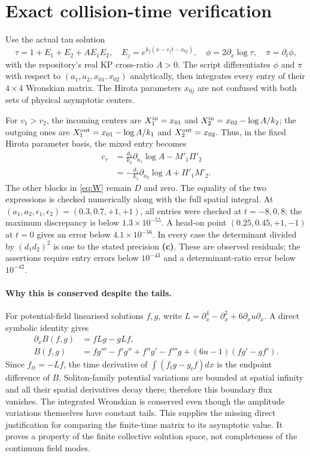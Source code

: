 \documentclass[11pt]{article}
\newcommand{\Lc}{\textbf{(c)}}
\begin{document}
\section{Exact collision-time verification}
Use the actual tau solution
\begin{equation}
 \tau=1+E_1+E_2+AE_1E_2,\quad
 E_j=e^{k_j(x-v_jt-x_{0j})},\quad
 \phi=2\partial_x\log\tau,\quad \pi=\partial_t\phi,
\end{equation}
with the repository's real KP cross-ratio $A>0$. The script differentiates
$\phi$ and $\pi$ with respect to $(a_1,a_2,x_{01},x_{02})$ analytically,
then integrates every entry of their $4\times4$ Wronskian matrix. The
Hirota parameters $x_{0j}$ are not confused with both sets of physical
asymptotic centers.

For $v_1>v_2$, the incoming centers are
$X_1^{\rm in}=x_{01}$ and $X_2^{\rm in}=x_{02}-\log A/k_2$; the outgoing
ones are $X_1^{\rm out}=x_{01}-\log A/k_1$ and
$X_2^{\rm out}=x_{02}$. Thus, in the fixed Hirota parameter basis, the
mixed entry becomes
\begin{align}\label{eq:c_tau}
 c_\tau
 &=\frac{d_2}{k_2}\partial_{a_1}\log A-M'_1\Pi'_2\nonumber\\
 &=-\frac{d_1}{k_1}\partial_{a_2}\log A+\Pi'_1M'_2.
\end{align}
The other blocks in \eqref{eq:W} remain $D$ and zero. The equality of the
two expressions is checked numerically along with the full spatial integral.
At $(a_1,a_2,\epsilon_1,\epsilon_2)=(0.3,0.7,+1,+1)$, all entries were
checked at $t=-8,0,8$; the maximum discrepancy is below $1.3\times10^{-55}$.
A head-on point $(0.25,0.45,+1,-1)$ at $t=0$ gives an error below
$4.1\times10^{-56}$. In every case the determinant divided by
$(d_1d_2)^2$ is one to the stated precision \Lc. These are observed
residuals; the assertions require entry errors below $10^{-43}$ and a
determinant-ratio error below $10^{-42}$.

\paragraph{Why this is conserved despite the tails.}
For potential-field linearised solutions $f,g$, write
$L=\partial_x^4-\partial_x^2+6\partial_xu\partial_x$.
A direct symbolic identity gives
\begin{align}
 \partial_x B(f,g)&=fLg-gLf,\\
 B(f,g)&=fg'''-f'g''+f''g'-f'''g
                  +(6u-1)(fg'-gf').
\end{align}
Since $f_{tt}=-Lf$, the time derivative of
$\int(f_tg-g_tf)dx$ is the endpoint difference of $B$.
Soliton-family potential variations are bounded at spatial infinity and
all their spatial derivatives decay there; therefore this boundary flux
vanishes. The integrated Wronskian is conserved even though the amplitude
variations themselves have constant tails. This supplies the missing direct
justification for comparing the finite-time matrix to its asymptotic value.
It proves a property of the finite collective solution space, not
completeness of the continuum field modes.
\end{document}
